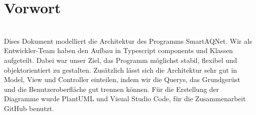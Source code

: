 \section{Vorwort}
\\Dises Dokument modelliert die Architektur des Programms SmartAQNet. Wir als Entwickler-Team haben den Aufbau in Typescript components und Klassen aufgeteilt. Dabei war unser Ziel, das Programm möglichst stabil, flexibel und objektorientiert zu gestalten. Zusätzlich lässt sich die Architektur sehr gut in Model, View und Controller einteilen, indem wir die Querys, das Grundgerüst und die Benutzeroberfläche gut trennen können. Für die Erstellung der Diagramme wurde PlantUML und Visual Studio Code, für die Zusammenarbeit GitHub benutzt.
